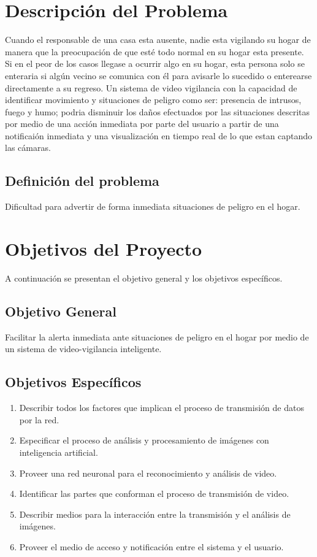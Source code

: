 \section{Descripción del Problema}
Cuando el responsable de una casa esta ausente, nadie esta vigilando su hogar de manera que la preocupación de que esté todo normal en su hogar esta presente. Si en el peor de los casos llegase a ocurrir algo en su hogar, esta persona solo se enteraria si algún vecino se comunica con él para avisarle lo sucedido o enterearse directamente a su regreso. Un sistema de video vigilancia con la capacidad de identificar movimiento y situaciones de peligro como ser: presencia de intrusos, fuego y humo; podria disminuir los daños efectuados por las situaciones descritas por medio de una acción inmediata por parte del usuario a partir de una notificaión inmediata y una visualización en tiempo real de lo que estan captando las cámaras.\

\subsection{Definición del problema}
Dificultad para advertir de forma inmediata situaciones de peligro en el hogar.

\section{Objetivos del Proyecto}
A continuación se presentan el objetivo general y los objetivos específicos.

\subsection{Objetivo General}
Facilitar la alerta inmediata ante situaciones de peligro en el hogar por medio de un sistema de video-vigilancia inteligente.

\subsection{Objetivos Específicos}
\begin{enumerate}
    \item Describir todos los factores que implican el proceso de transmisión de datos por la red.
    \item Especificar el proceso de análisis y procesamiento de imágenes con inteligencia artificial.
    \item Proveer una red neuronal para el reconocimiento y análisis de video.
    \item Identificar las partes que conforman el proceso de transmisión de video.
    \item Describir medios para la interacción entre la transmisión y el análisis de imágenes.
    \item Proveer el medio de acceso y notificación entre el sistema y el usuario.
\end{enumerate}

